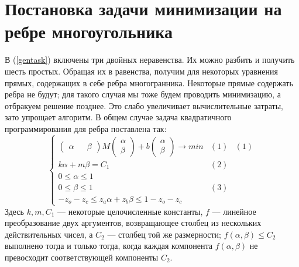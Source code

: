 \documentclass[pdftex,ptm,12pt,a4paper]{report}
\begin{document}
\section{Постановка задачи минимизации на ребре многоугольника}
  В (\ref{gentask}) включены три двойных неравенства.
  Их можно разбить и получить шесть простых.
  Обращая их в равенства, получим для некоторых уравнения прямых, содержащих в себе ребра многогранника.
  Некоторые прямые содержать ребра не будут; для такого случая мы тоже будем проводить минимизацию, а отбракуем решение позднее. 
  Это слабо увеличивает вычислительные затраты, зато упрощает алгоритм.
  В общем случае задача квадратичного программирования для ребра поставлена так:
  \begin{equation}\label{task1dim}
          \begin{cases}
          \begin{pmatrix} \alpha && \beta \end{pmatrix}
               M
             \begin{pmatrix} \alpha \\ \beta \end{pmatrix} +
             b \begin{pmatrix} \alpha \\ \beta \end{pmatrix} \to min &(1) & (1)\\ 
             k \alpha + m \beta = C_1 & (2) \\
             0 \le  \alpha   \le  1  \\
             0 \le  \beta   \le  1  &(3)\\
              -z_o - z_c \le  z_a \alpha + z_b \beta \le  1 -z_o - z_c  
          \end{cases}
      \end{equation}
  Здесь $k, m, C_1$ --- некоторые целочисленные константы,
  $f$ --- линейное преобразование двух аргументов, возвращающее столбец из нескольких действительных чисел,
  а $C_2$ --- столбец той же размерности;
  $f(\alpha, \beta) \le C_2$ выполнено тогда и только тогда, когда каждая компонента $f(\alpha, \beta)$ не превосходит соответствующей компоненты $C_2$.
\end{document}
